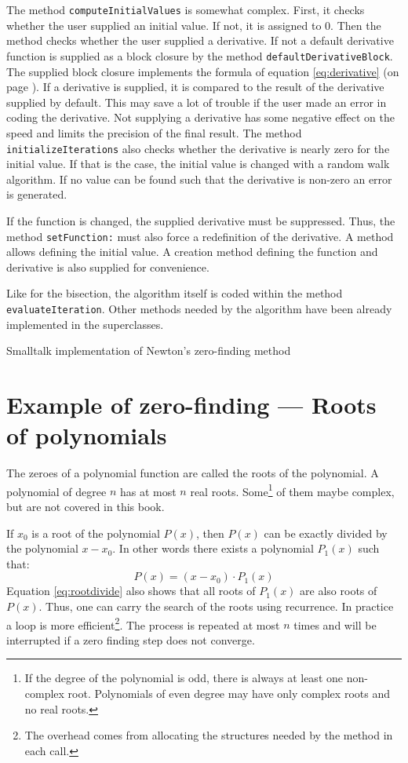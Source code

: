 \documentclass[twoside]{book}
\begin{document}
The method {\tt computeInitialValues} is somewhat complex. First,
it checks whether the user supplied an initial value. If not, it
is assigned to 0. Then the method checks whether the user supplied
a derivative. If not a default derivative function is supplied as
a block closure by the method {\tt defaultDerivativeBlock}. The
supplied block closure implements the formula of equation
\ref{eq:derivative} (on page \pageref{eq:derivative}). If a
derivative is supplied, it is compared to the result of the
derivative supplied by default. This may save a lot of trouble if
the user made an error in coding the derivative. Not supplying a
derivative has some negative effect on the speed and limits the
precision of the final result. The method {\tt
initializeIterations} also checks whether the derivative is nearly
zero for the initial value. If that is the case, the initial value
is changed with a random walk algorithm. If no value can be found
such that the derivative is non-zero an error is generated.

If the function is changed, the supplied derivative must be
suppressed. Thus, the method {\tt setFunction:} must also force a
redefinition of the derivative. A method allows defining the
initial value. A creation method defining the function and
derivative is also supplied for convenience.

Like for the bisection, the algorithm itself is coded within the
method {\tt evaluateIteration}. Other methods needed by the
algorithm have been already implemented in the superclasses.
\begin{listing} Smalltalk implementation of Newton's zero-finding method \label{ls:newtonZero}

\end{listing}




\section{Example of zero-finding --- Roots of polynomials}
\label{sec:polroots} The zeroes of a polynomial function are
called the roots of the polynomial. A polynomial of degree $n$ has
at most $n$ real roots. Some\footnote{If the degree of the
polynomial is odd, there is always at least one non-complex root.
Polynomials of even degree may have only complex roots and no real
roots.} of them maybe complex, but are not covered in this book.

If $x_0$ is a root of the polynomial $P\left(x\right)$, then
$P\left(x\right)$ can be exactly divided by the polynomial
$x-x_0$. In other words there exists a polynomial
$P_1\left(x\right)$ such that:
\begin{equation}
\label{eq:rootdivide}
  P\left(x\right) = \left(x-x_0\right)\cdot P_1\left(x\right)
\end{equation}
Equation \ref{eq:rootdivide} also shows that all roots of
$P_1\left(x\right)$ are also roots of $P\left(x\right)$. Thus, one
can carry the search of the roots using recurrence. In practice a
loop is more efficient\footnote{The overhead comes from allocating
the structures needed by the method in each call.}. The process is
repeated at most $n$ times and will be interrupted if a zero
finding step does not converge.
\end{document}
